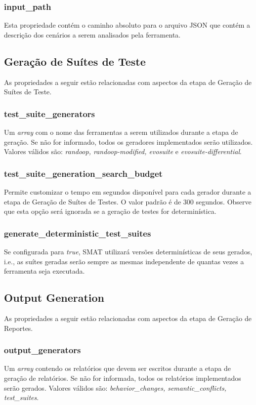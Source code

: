 \documentclass[12pt]{article}
\begin{document}
\subsubsection{input\_path}
Esta propriedade contém o caminho absoluto para o arquivo JSON que contém a descrição dos cenários a serem analisados pela ferramenta.

\subsection{Geração de Suítes de Teste}
As propriedades a seguir estão relacionadas com aspectos da etapa de Geração de Suítes de Teste.

\subsubsection{test\_suite\_generators}
Um \textit{array} com o nome das ferramentas a serem utilizados durante a etapa de geração. Se não for informado, todos os geradores implementados serão utilizados. Valores válidos são: \textit{randoop, randoop-modified, evosuite} e \textit{evosuite-differential}.

\subsubsection{test\_suite\_generation\_search\_budget}
Permite customizar o tempo em segundos disponível para cada gerador durante a etapa de Geração de Suítes de Testes. O valor padrão é de 300 segundos. Observe que esta opção será ignorada se a geração de testes for determinística.

\subsubsection{generate\_deterministic\_test\_suites}
Se configurada para \textit{true}, SMAT utilizará versões determinísticas de seus gerados, i.e., as suítes geradas serão sempre as mesmas independente de quantas vezes a ferramenta seja executada.

\subsection{Output Generation}
As propriedades a seguir estão relacionadas com aspectos da etapa de Geração de Reportes.

\subsubsection{output\_generators}
Um \textit{array} contendo os relatórios que devem ser escritos durante a etapa de geração de relatórios. Se não for informada, todos os relatórios implementados serão gerados. Valores válidos são: \textit{behavior\_changes, semantic\_conflicts, test\_suites}.
\end{document}
